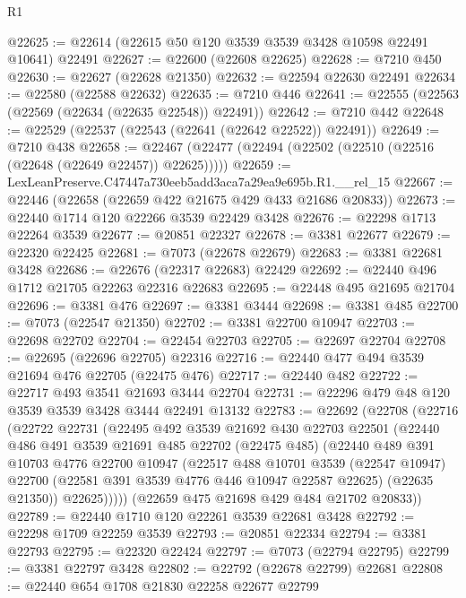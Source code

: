 \begin{lexlean}{R1}
\begin{coremodule}
@22625 := @22614 (@22615 @50 @120 @3539 @3539 @3428 @10598 @22491 @10641) @22491
@22627 := @22600 (@22608 @22625)
@22628 := @7210 @450
@22630 := @22627 (@22628 @21350)
@22632 := @22594 @22630 @22491
@22634 := @22580 (@22588 @22632)
@22635 := @7210 @446
@22641 := @22555 (@22563 (@22569 (@22634 (@22635 @22548)) @22491))
@22642 := @7210 @442
@22648 := @22529 (@22537 (@22543 (@22641 (@22642 @22522)) @22491))
@22649 := @7210 @438
@22658 := @22467 (@22477 (@22494 (@22502 (@22510 (@22516 (@22648 (@22649 @22457)) @22625)))))
@22659 := LexLeanPreserve.C47447a730eeb5add3aca7a29ea9e695b.R1.__rel_15
@22667 := @22446 (@22658 (@22659 @422 @21675 @429 @433 @21686 @20833))
@22673 := @22440 @1714 @120 @22266 @3539 @22429 @3428
@22676 := @22298 @1713 @22264 @3539
@22677 := @20851 @22327
@22678 := @3381 @22677
@22679 := @22320 @22425
@22681 := @7073 (@22678 @22679)
@22683 := @3381 @22681 @3428
@22686 := @22676 (@22317 @22683) @22429
@22692 := @22440 @496 @1712 @21705 @22263 @22316 @22683
@22695 := @22448 @495 @21695 @21704
@22696 := @3381 @476
@22697 := @3381 @3444
@22698 := @3381 @485
@22700 := @7073 (@22547 @21350)
@22702 := @3381 @22700 @10947
@22703 := @22698 @22702
@22704 := @22454 @22703
@22705 := @22697 @22704
@22708 := @22695 (@22696 @22705) @22316
@22716 := @22440 @477 @494 @3539 @21694 @476 @22705 (@22475 @476)
@22717 := @22440 @482
@22722 := @22717 @493 @3541 @21693 @3444 @22704
@22731 := @22296 @479 @48 @120 @3539 @3539 @3428 @3444 @22491 @13132
@22783 := @22692
    (@22708
      (@22716
        (@22722
          @22731
          (@22495
            @492
            @3539
            @21692
            @430
            @22703
            @22501
            (@22440
              @486
              @491
              @3539
              @21691
              @485
              @22702
              (@22475 @485)
              (@22440
                @489
                @391
                @10703
                @4776
                @22700
                @10947
                (@22517
                  @488
                  @10701
                  @3539
                  (@22547 @10947)
                  @22700
                  (@22581 @391 @3539 @4776 @446 @10947 @22587 @22625)
                  (@22635 @21350))
                @22625)))))
      (@22659 @475 @21698 @429 @484 @21702 @20833))
@22789 := @22440 @1710 @120 @22261 @3539 @22681 @3428
@22792 := @22298 @1709 @22259 @3539
@22793 := @20851 @22334
@22794 := @3381 @22793
@22795 := @22320 @22424
@22797 := @7073 (@22794 @22795)
@22799 := @3381 @22797 @3428
@22802 := @22792 (@22678 @22799) @22681
@22808 := @22440 @654 @1708 @21830 @22258 @22677 @22799

\end{coremodule}
\end{lexlean}
